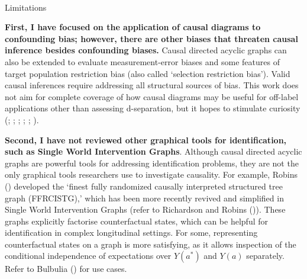 \documentclass[
  single column]{article}
\makeatletter
\let\oldparagraph\paragraph
\renewcommand{\paragraph}{
    \@ifstar
      \xxxParagraphStar
      \xxxParagraphNoStar
  }
\newcommand{\xxxParagraphStar}[1]{\oldparagraph*{#1}\mbox{}}
\newcommand{\xxxParagraphNoStar}[1]{\oldparagraph{#1}\mbox{}}
\makeatother
\begin{document}
\paragraph{Limitations}\label{limitations}

\textbf{First, I have focused on the application of causal diagrams to
confounding bias; however, there are other biases that threaten causal
inference besides confounding biases.} Causal directed acyclic graphs
can also be extended to evaluate measurement-error biases and some
features of target population restriction bias (also called `selection
restriction bias'). Valid causal inferences require addressing all
structural sources of bias. This work does not aim for complete coverage
of how causal diagrams may be useful for off-label applications other
than assessing d-separation, but it hopes to stimulate curiosity
(;
;
;
;
;
).

\textbf{Second, I have not reviewed other graphical tools for
identification, such as Single World Intervention Graphs}. Although
causal directed acyclic graphs are powerful tools for addressing
identification problems, they are not the only graphical tools
researchers use to investigate causality. For example, Robins
() developed the `finest fully randomized
causally interpreted structured tree graph (FFRCISTG),' which has been
more recently revived and simplified in Single World Intervention Graphs
(refer to Richardson and Robins
()). These graphs
explicitly factorise counterfactual states, which can be helpful for
identification in complex longitudinal settings. For some, representing
counterfactual states on a graph is more satisfying, as it allows
inspection of the conditional independence of expectations over
\(Y(a^*)\) and \(Y(a)\) separately. Refer to Bulbulia
() for use cases.
\end{document}
